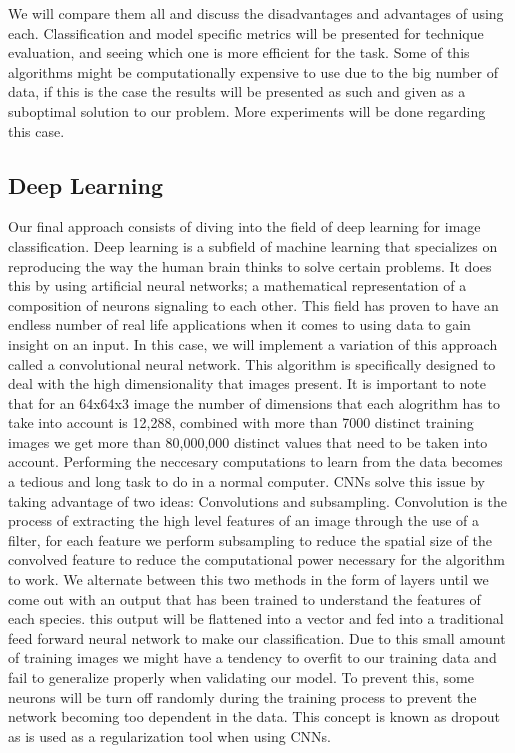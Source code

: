 \documentclass[11pt]{article}
\begin{document}
\begin{singlespace}
 We will compare them all and discuss the disadvantages and advantages of using each. Classification and model specific metrics will be presented for technique evaluation, and seeing which one is more efficient for the task. Some of this algorithms might be computationally expensive to use due to the big number of data, if this is the case the results will be presented as such and given as a suboptimal solution to our problem. More experiments will be done regarding this case. 

\subsection{Deep Learning}
Our final approach consists of diving into the field of deep learning for image classification. Deep learning is a subfield of machine learning that specializes on reproducing the way the human brain thinks to solve certain problems. It does this by using artificial neural networks; a mathematical representation of a composition of neurons signaling to each other. This field has proven to have an endless number of real life applications when it comes to using data to gain insight on an input. In this case, we will implement a variation of this approach called a convolutional neural network. This algorithm is specifically designed to deal with the high dimensionality that images present. It is important to note that for an 64x64x3 image the number of dimensions that each alogrithm has to take into account is 12,288, combined with more than 7000 distinct training images we get more than 80,000,000 distinct values that need to be taken into account. Performing the neccesary computations to learn from the data becomes a tedious and long task to do in a normal computer. CNNs solve this issue by taking advantage of two ideas: Convolutions and subsampling. Convolution is the process of extracting the high level features of an image through the use of a filter, for each feature we perform subsampling to reduce the spatial size of the convolved feature to reduce the computational power necessary for the algorithm to work. We alternate between this two methods in the form of layers until we come out with an output that has been trained to understand the features of each species. this output will be flattened into a vector and fed into a traditional feed forward neural network to make our classification. Due to this small amount of training images we might have a tendency to overfit to our training data and fail to generalize properly when validating our model. To prevent this, some neurons will be turn off randomly during the training process to prevent the network becoming too dependent in the data. This concept is known as dropout as is used as a regularization tool when using CNNs. \\


\end{singlespace}
\end{document}
